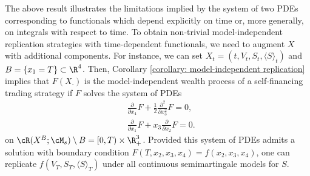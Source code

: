 \documentclass[11pt]{article}
\begin{document}
The above result illustrates the limitations implied by the system of two PDEs corresponding to functionals which depend explicitly on time or, more generally, on integrals with respect to time. To obtain non-trivial model-independent replication strategies with time-dependent functionals, we need to augment $X$ with additional components. For instance, we can set $X_t = (t, V_t, S_t, \langle S \rangle_t)$ and $B = \{x_1 = T\} \subset \R^4$. Then, Corollary \ref{corollary: model-independent replication} implies that $F(X_\cdot)$ is the model-independent wealth process of a self-financing trading strategy if $F$ solves the system of PDEs
\begin{align}
&\frac{\partial}{\partial x_4} F + \frac{1}{2} \frac{\partial^2}{\partial x_3^2} F = 0 \label{PDE for F(t,V,S,[S]) due to [S]}, \\
&\frac{\partial}{\partial x_1} F + x_3 \frac{\partial}{\partial x_2} F = 0 \label{PDE for F(t,V,S,[S]) due to t}.
\end{align}
on $\cR(X^B;\cM_s) \setminus B = [0,T) \times \R_+^3$. Provided this system of PDEs admits a solution with boundary condition $F(T, x_2, x_3, x_4) = f(x_2,x_3,x_4)$, one can replicate $f(V_T, S_T, \langle S \rangle_T)$ under all continuous semimartingale models for $S$.
\end{document}
